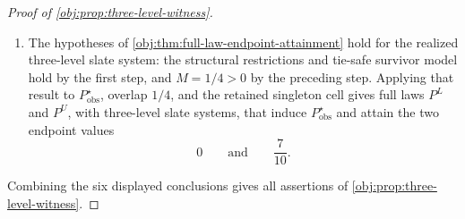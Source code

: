 \documentclass[11pt]{article}
\begin{document}
\begin{proof}[Proof of \cref{obj:prop:three-level-witness}]
\begin{enumerate}
\item The hypotheses of \cref{obj:thm:full-law-endpoint-attainment} hold for the realized three-level slate system: the structural restrictions and tie-safe survivor model hold by the first step, and \(M=1/4>0\) by the preceding step.  Applying that result to \(P_{\mathrm{obs}}^{\star}\), overlap \(1/4\), and the retained singleton cell gives full laws \(P^L\) and \(P^U\), with three-level slate systems, that induce \(P_{\mathrm{obs}}^{\star}\) and attain the two endpoint values
\[
0
\qquad\text{and}\qquad
\frac{7}{10}.
\]
\end{enumerate}
Combining the six displayed conclusions gives all assertions of \cref{obj:prop:three-level-witness}. %
\end{proof}
\end{document}
